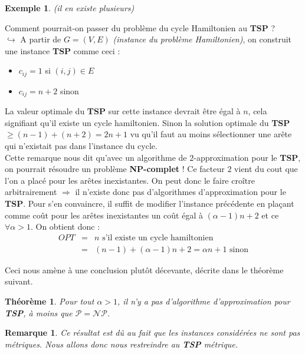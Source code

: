 \documentclass{article}
\newcommand{\titre}[1]{\textcolor{title}{#1}}
\newtheorem{exemple}{Exemple}[section]
\newtheorem{rem}{Remarque}[section]
\newtheorem{thm}{Th\'eor\`eme}[section]
\begin{document}
\begin{sffamily}
\begin{exemple}
(il en existe plusieurs)

\end{exemple}

Comment pourrait-on passer du problème du cycle Hamiltonien au \textbf{\titre{TSP}} ? \\
$\hookrightarrow$ A partir de $G=(V,E)$ \textit{(instance du problème Hamiltonien)}, on construit une instance \textbf{\titre{TSP}} comme 
ceci : 
\begin{itemize}
\item $c_{ij} = 1$ si $(i,j)\in E$
\item $c_{ij} = n+2$ sinon
\end{itemize}
La valeur optimale du \textbf{\titre{TSP}} sur cette instance devrait être égal à $n$, cela signifiant qu'il existe un cycle hamiltonien. 
Sinon la solution optimale du \textbf{\titre{TSP}} $\geq (n-1)+(n+2) = 2n+1$ vu qu'il faut au moins sélectionner une arête qui n'existait 
pas dans l'instance du cycle. \\

Cette remarque nous dit qu'avec un algorithme de $2$-approximation pour le \textbf{\titre{TSP}}, on pourrait résoudre un problème 
\textbf{NP-complet} ! Ce facteur $2$ vient du cout que l'on a placé pour les arêtes inexistantes. On peut donc le faire croître
arbitrairement $\Rightarrow$ il n'existe donc pas d'algorithmes d'approximation pour le \textbf{\titre{TSP}}. Pour s'en convaincre, il 
suffit de modifier l'instance précédente en plaçant comme coût pour les arêtes inexistantes un coût égal à $(\alpha-1)n+2$ et ce $\forall 
\alpha>1$. On obtient donc :
\begin{eqnarray}
\nonumber OPT & = & n \text{ s'il existe un cycle hamiltonien} \\
\nonumber & = & (n-1) + (\alpha-1)n+2 = \alpha n +1 \text{ sinon}
\end{eqnarray}

Ceci nous amène à une conclusion plutôt décevante, décrite dans le théorème suivant.

\begin{thm}
Pour tout $\alpha > 1$, il n'y a pas d'algorithme d'approximation pour \textbf{\titre{TSP}}, à moins que $\mathcal{P=NP}$.
\end{thm}

\begin{rem}
Ce résultat est dû au fait que les instances considérées ne sont pas métriques. Nous allons donc nous restreindre au \textbf{\titre{TSP}} 
métrique.
\end{rem}


\end{sffamily}
\end{document}
